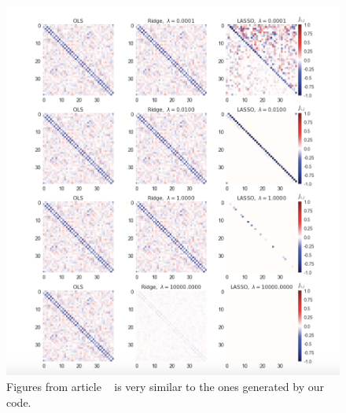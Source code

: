 \begin{figure}[h!]
\includegraphics[width = 0.8\paperwidth]{figures/Regression_metha_article.png} 
\caption{Figures from article ~\cite{HighBias} is very similar to the ones generated by our code. } 
\label{fig:regression-mehta}
\end{figure}

